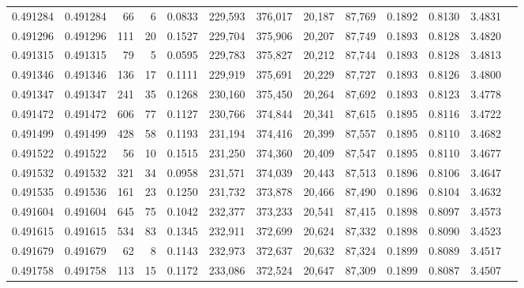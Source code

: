 \begin{tabular}{rrrrrrrrrrrrr}
0.491284 & 0.491284 &    66 &     6 &                                     0.0833 & 229,593 & 376,017 &  20,187 &  87,769 & 0.1892 & 0.8130 & 3.4831 \\
0.491296 & 0.491296 &   111 &    20 &                                     0.1527 & 229,704 & 375,906 &  20,207 &  87,749 & 0.1893 & 0.8128 & 3.4820 \\
0.491315 & 0.491315 &    79 &     5 &                                     0.0595 & 229,783 & 375,827 &  20,212 &  87,744 & 0.1893 & 0.8128 & 3.4813 \\
0.491346 & 0.491346 &   136 &    17 &                                     0.1111 & 229,919 & 375,691 &  20,229 &  87,727 & 0.1893 & 0.8126 & 3.4800 \\
0.491347 & 0.491347 &   241 &    35 &                                     0.1268 & 230,160 & 375,450 &  20,264 &  87,692 & 0.1893 & 0.8123 & 3.4778 \\
0.491472 & 0.491472 &   606 &    77 &                                     0.1127 & 230,766 & 374,844 &  20,341 &  87,615 & 0.1895 & 0.8116 & 3.4722 \\
0.491499 & 0.491499 &   428 &    58 &                                     0.1193 & 231,194 & 374,416 &  20,399 &  87,557 & 0.1895 & 0.8110 & 3.4682 \\
0.491522 & 0.491522 &    56 &    10 &                                     0.1515 & 231,250 & 374,360 &  20,409 &  87,547 & 0.1895 & 0.8110 & 3.4677 \\
0.491532 & 0.491532 &   321 &    34 &                                     0.0958 & 231,571 & 374,039 &  20,443 &  87,513 & 0.1896 & 0.8106 & 3.4647 \\
0.491535 & 0.491536 &   161 &    23 &                                     0.1250 & 231,732 & 373,878 &  20,466 &  87,490 & 0.1896 & 0.8104 & 3.4632 \\
0.491604 & 0.491604 &   645 &    75 &                                     0.1042 & 232,377 & 373,233 &  20,541 &  87,415 & 0.1898 & 0.8097 & 3.4573 \\
0.491615 & 0.491615 &   534 &    83 &                                     0.1345 & 232,911 & 372,699 &  20,624 &  87,332 & 0.1898 & 0.8090 & 3.4523 \\
0.491679 & 0.491679 &    62 &     8 &                                     0.1143 & 232,973 & 372,637 &  20,632 &  87,324 & 0.1899 & 0.8089 & 3.4517 \\
0.491758 & 0.491758 &   113 &    15 &                                     0.1172 & 233,086 & 372,524 &  20,647 &  87,309 & 0.1899 & 0.8087 & 3.4507 \\

\end{tabular}
